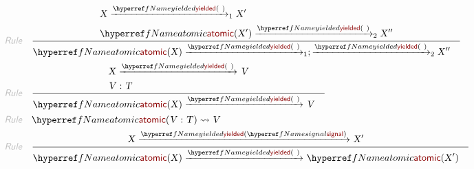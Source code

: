 \begin{align*}
  \KEY{Rule} \quad
    & \RULE{
      &  \VAR{X} \xrightarrow{\NAMEREF{yielded}(   \  )}_{1} 
          \VAR{X}'\\&
         \NAMEREF{atomic}
                      (  \VAR{X}' ) \xrightarrow{\NAMEREF{yielded}(   \  )}_{2} 
          \VAR{X}''
      }{
      &  \NAMEREF{atomic}
                      (  \VAR{X} ) \xrightarrow{\NAMEREF{yielded}(   \  )}_{1} ; \xrightarrow{\NAMEREF{yielded}(   \  )}_{2} 
          \VAR{X}''
      }
\\
  \KEY{Rule} \quad
    & \RULE{
      &  \VAR{X} \xrightarrow{\NAMEREF{yielded}(   \  )}_{} 
          \VAR{V}\\&
         \VAR{V} : \VAR{T}
      }{
      &  \NAMEREF{atomic}
                      (  \VAR{X} ) \xrightarrow{\NAMEREF{yielded}(   \  )}_{} 
          \VAR{V}
      }
\\
  \KEY{Rule} \quad
    & \NAMEREF{atomic}
        (  \VAR{V} : \VAR{T} ) \leadsto 
        \VAR{V}
\\
  \KEY{Rule} \quad
    & \RULE{
      &  \VAR{X} \xrightarrow{\NAMEREF{yielded}(  \NAMEREF{signal} )}_{} 
          \VAR{X}'
      }{
      &  \NAMEREF{atomic}
                      (  \VAR{X} ) \xrightarrow{\NAMEREF{yielded}(   \  )}_{} 
          \NAMEREF{atomic}
            (  \VAR{X}' )
      }
\end{align*}


